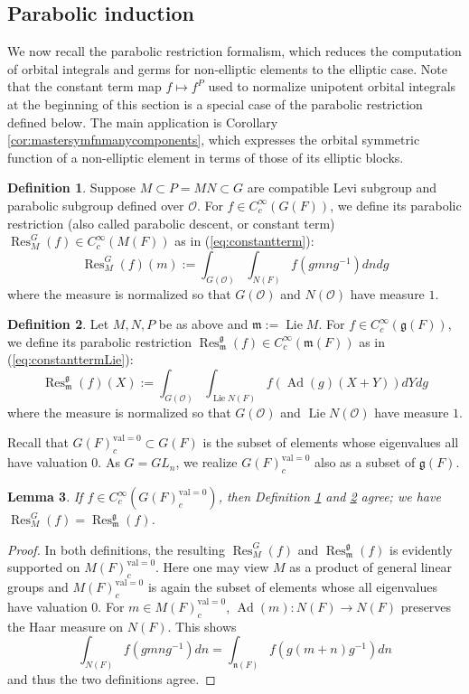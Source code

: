 \documentclass{amsart}
\numberwithin{equation}{section}
\newtheorem{lemma}{Lemma}[section]
\theoremstyle{definition}
\newtheorem{definition}[lemma]{Definition}%
\def\val{\mathrm{val}}
\DeclareMathOperator{\Ad}{Ad}
\DeclareMathOperator{\Res}{\mathrm{Res}}
\DeclareMathOperator{\Lie}{Lie}
\newcommand{\cO}{\mathcal{O}}
\newcommand{\fm}{\mathfrak{m}}
\newcommand{\fn}{\mathfrak{n}}
\newcommand{\fg}{\mathfrak{g}}
\begin{document}
\subsection{Parabolic induction}\label{subsec:paraind}
We now recall the parabolic restriction formalism, which reduces the computation of orbital integrals and germs for non-elliptic elements to the elliptic case. Note that the constant term map $f\mapsto f^P$ used to normalize unipotent orbital integrals at the beginning of this section is a special case of the parabolic restriction defined below. The main application is Corollary \ref{cor:mastersymfnmanycomponents}, which expresses the orbital symmetric function of a non-elliptic element in terms of those of its elliptic blocks.

\begin{definition}\label{def:parabolic-restriction-group} Suppose $M\subset P=MN\subset G$ are compatible Levi subgroup and parabolic subgroup defined over $\cO$. For $f\in C_c^{\infty}(G(F))$, we define its parabolic restriction (also called parabolic descent, or constant term) $\Res_M^G(f)\in C_c^{\infty}(M(F))$ as in (\ref{eq:constantterm}):
\[
\Res_M^G(f)(m):=\int_{G(\cO)}\int_{N(F)}f(gmng^{-1})dndg
\]
where the measure is normalized so that $G(\cO)$ and $N(\cO)$ have measure $1$.
\end{definition}

\begin{definition}\label{def:parabolic-restriction-algebra} Let $M,N,P$ be as above and $\fm:=\Lie M$. For $f\in C_c^{\infty}(\fg(F))$, we define its parabolic restriction $\Res_{\fm}^{\fg}(f)\in C_c^{\infty}(\fm(F))$ as in (\ref{eq:constanttermLie}):
\[
\Res_{\fm}^{\fg}(f)(X):=\int_{G(\cO)}\int_{\Lie N(F)}f(\Ad(g)(X+Y))dYdg
\]
where the measure is normalized so that $G(\cO)$ and $\Lie N(\cO)$ have measure $1$.
\end{definition}

Recall that $G(F)_c^{\val=0}\subset G(F)$ is the subset of elements whose eigenvalues all have valuation $0$. As $G=GL_n$, we realize $G(F)_c^{\val=0}$ also as a subset of $\fg(F)$.

\begin{lemma}\label{lem:definitionsagree} If $f\in C_c^{\infty}(G(F)_c^{\val=0})$, then Definition \ref{def:parabolic-restriction-group} and \ref{def:parabolic-restriction-algebra} agree; we have $\Res_M^G(f)=\Res_{\fm}^{\fg}(f)$. 
\end{lemma}

\begin{proof} In both definitions, the resulting $\Res_M^G(f)$ and $\Res_{\fm}^{\fg}(f)$ is evidently supported on $M(F)_c^{\val=0}$. Here one may view $M$ as a product of general linear groups and $M(F)_c^{\val=0}$ is again the subset of elements whose all eigenvalues have valuation $0$. For $m\in M(F)_c^{\val=0}$, $\Ad(m):N(F)\rightarrow N(F)$ preserves the Haar measure on $N(F)$. This shows
\[
\int_{N(F)}f(gmng^{-1})dn=\int_{\fn(F)}f(g(m+n)g^{-1})dn
\]
and thus the two definitions agree.
\end{proof}
\end{document}
